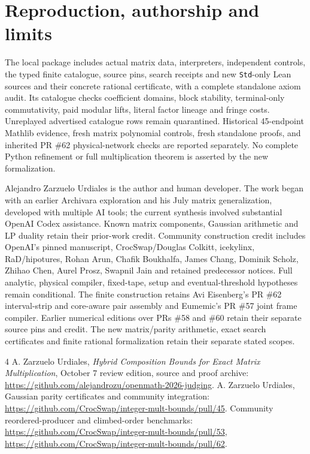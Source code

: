 \documentclass[11pt]{article}
\begin{document}
\section{Reproduction, authorship and limits}
The local package includes actual matrix data, interpreters, independent
controls, the typed finite catalogue, source pins, search receipts and new
\texttt{Std}-only Lean sources and their concrete rational certificate,
with a complete standalone axiom audit. Its catalogue checks coefficient domains,
block stability, terminal-only commutativity, paid modular lifts, literal
factor lineage and fringe costs. Unreplayed advertised catalogue rows remain
quarantined. Historical 45-endpoint Mathlib evidence, fresh matrix polynomial
controls, fresh standalone proofs, and inherited PR \#62 physical-network checks are
reported separately. No complete Python refinement or full multiplication
theorem is asserted by the new formalization.

Alejandro Zarzuelo Urdiales is the author and human developer. The work
began with an earlier Archivara exploration and his July matrix
generalization, developed with multiple AI tools; the current synthesis
involved substantial OpenAI Codex assistance. Known matrix components,
Gaussian arithmetic and LP duality retain their prior-work credit.
Community construction credit includes OpenAI's pinned manuscript,
CrocSwap/Douglas Colkitt, icekylinx, RaD/hipotures, Rohan Arun, Chafik
Boukhalfa, James Chang, Dominik Scholz, Zhihao Chen, Aurel Prosz, Swapnil
Jain and retained predecessor notices. Full analytic, physical compiler,
fixed-tape, setup and eventual-threshold hypotheses remain conditional.
The finite construction retains Avi Eisenberg's PR \#62 interval-strip and core-aware pair
assembly and Eumemic's PR \#57 joint frame compiler. Earlier numerical
editions over PRs \#58 and \#60 retain their separate source pins and credit. The new matrix/parity arithmetic,
exact search certificates and finite rational formalization retain their
separate stated scopes.

\begin{thebibliography}{4}
 A. Zarzuelo Urdiales, \emph{Hybrid Composition Bounds for
Exact Matrix Multiplication}, October 7 review edition, source and proof
archive: \url{https://github.com/alejandrozu/openmath-2026-judging}.
 A. Zarzuelo Urdiales, Gaussian parity certificates and
community integration: \url{https://github.com/CrocSwap/integer-mult-bounds/pull/45}.
 Community reordered-producer and climbed-order
benchmarks: \url{https://github.com/CrocSwap/integer-mult-bounds/pull/53},
\url{https://github.com/CrocSwap/integer-mult-bounds/pull/62}.
\end{thebibliography}
\end{document}
